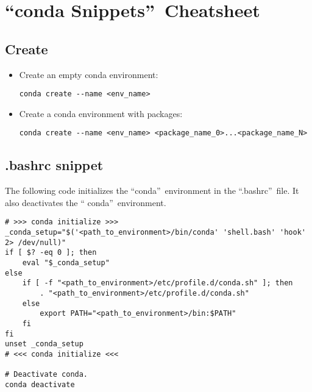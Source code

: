 \section{\textquotedblleft conda Snippets\textquotedblright\ Cheatsheet}



\subsection{Create}

\begin{itemize}
    \item Create an empty conda environment:
    \begin{verbatim}
conda create --name <env_name>
    \end{verbatim}
    \item Create a conda environment with packages:
    \begin{verbatim}
conda create --name <env_name> <package_name_0>...<package_name_N>
    \end{verbatim}
\end{itemize}

\subsection{.bashrc snippet}

The following code initializes the \textquotedblleft conda\textquotedblright\ environment in the
\textquotedblleft .bashrc\textquotedblright\ file. It also deactivates the \textquotedblleft 
conda\textquotedblright\ environment.
\begin{verbatim}
# >>> conda initialize >>>
_conda_setup="$('<path_to_environment>/bin/conda' 'shell.bash' 'hook' 2> /dev/null)"
if [ $? -eq 0 ]; then
    eval "$_conda_setup"
else
    if [ -f "<path_to_environment>/etc/profile.d/conda.sh" ]; then
        . "<path_to_environment>/etc/profile.d/conda.sh"
    else
        export PATH="<path_to_environment>/bin:$PATH"
    fi
fi
unset _conda_setup
# <<< conda initialize <<<

# Deactivate conda.
conda deactivate
\end{verbatim}

